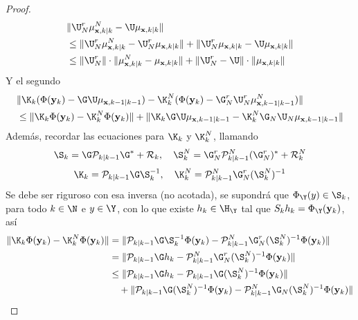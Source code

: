 \begin{proof}
\begin{equation*}
\begin{aligned}
			&\| \U_N^r   \mu^N_{\mathbf{x}, k|k}  -  \U \mu_{\mathbf{x}, k|k} \| \\ 
			& \leq  \| \U_N^r   \mu^N_{\mathbf{x}, k|k}  - \U_N^r   \mu_{\mathbf{x}, k|k} \| + \| \U_N^r   \mu_{\mathbf{x}, k|k}  - \U \mu_{\mathbf{x}, k|k} \| \\
			& \leq \| \U_N^r  \| \cdot \| \mu^N_{\mathbf{x}, k|k}  - \mu_{\mathbf{x}, k|k} \| +  \| \U_N^r  -  \U \| \cdot \| \mu_{\mathbf{x}, k|k} \|
		\end{aligned}		 
	\end{equation*}
	Y el segundo
	\begin{equation*}
		\begin{aligned}
			&\| \K_k (\Phi(\mathbf{y}_k) -  \G \U  \mu_{\mathbf{x},k-1|k-1}) -  \K_k^N (\Phi(\mathbf{y}_k) - \G_N^r \U_N^r \mu_{\mathbf{x}, k-1 | k-1}^N)  \| \\
			& \leq \|  \K_k \Phi(\mathbf{y}_k) - \K_k^N \Phi(\mathbf{y}_k) \| + \| \K_k \G \U  \mu_{\mathbf{x},k-1|k-1} - \K_k^N \G_N \U_N  \mu_{\mathbf{x},k-1|k-1} \|
		\end{aligned}
	\end{equation*}
		Además, recordar las ecuaciones para  $\K_k$ y $\K_k^N$, llamando
	\begin{equation*}
		\S_k = \G \mathcal{P}_{k|k-1} \G^* + \mathcal{R}_k, \quad \S_k^N =  \G_N^r \mathcal{P}^N_{k|k-1} (\G^r_N)^* + \mathcal{R}_k^N
	\end{equation*}
	\begin{equation*}
		\K_k = \mathcal{P}_{k|k-1} \G
		\S_k^{-1}, \quad \K_k^N = \mathcal{P}_{k|k-1}^N \G_N^r
		(\S_k^N)^{-1}
	\end{equation*}
	Se debe ser riguroso con esa inversa (no acotada), se supondrá que $\Phi_\Y (y) \in \S_k$, para todo $k \in \N$ e $y \in \Y$, con lo que existe $h_k \in \H_\Y$ tal que $S_k h_k = \Phi_\Y(\mathbf{y}_k)$, así
	\begin{equation*}
		\begin{aligned}
			\|  \K_k \Phi(\mathbf{y}_k) - \K_k^N \Phi(\mathbf{y}_k) \|  
			& = \| \mathcal{P}_{k|k-1} \G
			\S_k^{-1} \Phi(\mathbf{y}_k) -  \mathcal{P}_{k|k-1}^N \G_N^r (\S_k^N)^{-1} \Phi(\mathbf{y}_k)  \| \\
			& =  \| \mathcal{P}_{k|k-1} \G h_k -  \mathcal{P}_{k|k-1}^N \G_N^r (\S_k^N)^{-1} \Phi(\mathbf{y}_k)  \|  \\
			& \leq  \| \mathcal{P}_{k|k-1} \G h_k -  \mathcal{P}_{k|k-1} \G (\S_k^N)^{-1} \Phi(\mathbf{y}_k)  \| \\ 
			& \quad +  \| \mathcal{P}_{k|k-1} \G (\S_k^N)^{-1} \Phi(\mathbf{y}_k)  -  \mathcal{P}_{k|k-1}^N \G_N (\S_k^N)^{-1} \Phi(\mathbf{y}_k)  \| \\

\end{aligned}
\end{equation*}
\end{proof}

